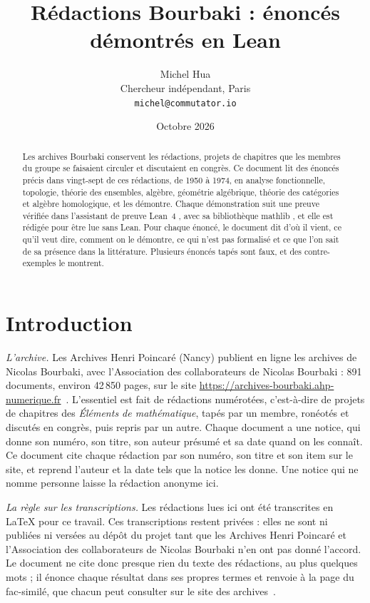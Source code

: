 \documentclass[11pt]{article}
\title{\Large Rédactions Bourbaki : énoncés démontrés en Lean}
\author{Michel Hua\\ \small Chercheur indépendant, Paris\\ \small \texttt{michel@commutator.io}}
\date{\small Octobre 2026}
\theoremstyle{plain}
\theoremstyle{definition}
\theoremstyle{plain}
\theoremstyle{definition}
\theoremstyle{remark}
\renewcommand{\_}{\bkunderscore\allowbreak}
\begin{document}
\maketitle

\begin{abstract}
\noindent Les archives Bourbaki conservent les rédactions, projets de chapitres que les membres du groupe se faisaient circuler et discutaient en congrès. Ce document lit des énoncés précis dans vingt-sept de ces rédactions, de 1950 à 1974, en analyse fonctionnelle, topologie, théorie des ensembles, algèbre, géométrie algébrique, théorie des catégories et algèbre homologique, et les démontre. Chaque démonstration suit une preuve vérifiée dans l'assistant de preuve Lean~4 \cite{lean4}, avec sa bibliothèque mathlib \cite{mathlib2020}, et elle est rédigée pour être lue sans Lean. Pour chaque énoncé, le document dit d'où il vient, ce qu'il veut dire, comment on le démontre, ce qui n'est pas formalisé et ce que l'on sait de sa présence dans la littérature. Plusieurs énoncés tapés sont faux, et des contre-exemples le montrent.
\end{abstract}

\tableofcontents

\section*{Introduction}

\emph{L'archive.} Les Archives Henri Poincaré (Nancy) publient en ligne les archives de Nicolas Bourbaki, avec l'Association des collaborateurs de Nicolas Bourbaki : 891 documents, environ 42\,850 pages, sur le site \url{https://archives-bourbaki.ahp-numerique.fr}~\cite{ahp}. L'essentiel est fait de rédactions numérotées, c'est-à-dire de projets de chapitres des \emph{Éléments de mathématique}, tapés par un membre, ronéotés et discutés en congrès, puis repris par un autre. Chaque document a une notice, qui donne son numéro, son titre, son auteur présumé et sa date quand on les connaît. Ce document cite chaque rédaction par son numéro, son titre et son item sur le site, et reprend l'auteur et la date tels que la notice les donne. Une notice qui ne nomme personne laisse la rédaction anonyme ici.

\emph{La règle sur les transcriptions.} Les rédactions lues ici ont été transcrites en \LaTeX{} pour ce travail. Ces transcriptions restent privées : elles ne sont ni publiées ni versées au dépôt du projet tant que les Archives Henri Poincaré et l'Association des collaborateurs de Nicolas Bourbaki n'en ont pas donné l'accord. Le document ne cite donc presque rien du texte des rédactions, au plus quelques mots ; il énonce chaque résultat dans ses propres termes et renvoie à la page du fac-similé, que chacun peut consulter sur le site des archives~\cite{ahp}.
\end{document}
